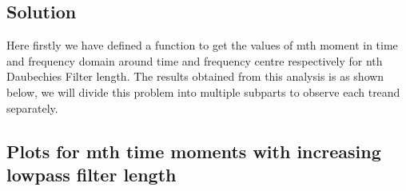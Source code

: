 \documentclass{article}
\begin{document}
\subsection{Solution}

Here firstly we have defined a function to get the values of mth moment in time and frequency domain around time and frequency centre respectively for nth Daubechies Filter length. The results obtained from this analysis is as shown below, we will divide this problem into multiple subparts to observe each treand separately.

\subsection{Plots for mth time moments with increasing lowpass filter length}

\begin{figure}[H]
    \centering
    \qquad
    \label{fig:example}%
\end{figure}

\begin{figure}[H]
    \centering
    \qquad
    \label{fig:example}%
\end{figure}
\end{document}
